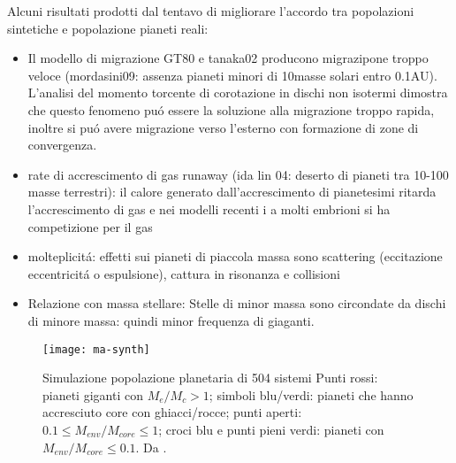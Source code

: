 
\begin{workout}
Alcuni risultati prodotti dal tentavo di migliorare l'accordo tra popolazioni sintetiche  e popolazione pianeti reali:
\begin{itemize}
\item Il modello di migrazione GT80 e tanaka02 producono migrazipone troppo veloce (mordasini09: assenza pianeti minori di 10masse solari entro 0.1AU). L'analisi del momento torcente di corotazione in dischi non isotermi dimostra che questo fenomeno pu\'o essere la soluzione alla migrazione troppo rapida, inoltre si pu\'o avere migrazione verso l'esterno con formazione di zone di convergenza.
\item rate di accrescimento di gas runaway (ida lin 04: deserto di pianeti tra 10-100 masse terrestri): il calore generato dall'accrescimento di pianetesimi ritarda l'accrescimento di gas e nei modelli recenti i a molti embrioni si ha competizione per il gas
\item molteplicit\'a: effetti sui pianeti di piaccola massa sono scattering (eccitazione eccentricit\'a o espulsione), cattura in risonanza e collisioni
\item Relazione con massa stellare: Stelle di minor massa sono circondate da dischi di minore massa: quindi minor frequenza di giaganti.%
\end{itemize}
\end{workout}


\begin{figure}[!ht]
\texttt{[image: ma-synth]}
\caption{Simulazione popolazione planetaria di 504 sistemi Punti rossi: pianeti giganti con $M_e/M_c>1$; simboli blu/verdi: pianeti che hanno accresciuto core con ghiacci/rocce; punti aperti: $0.1\leq M_{env}/M_{core}\leq1$; croci blu e punti pieni verdi: pianeti con $M_{env}/M_{core}\leq0.1$. Da \cite{mordasini2018planetary}.}\label{fig:ma-synth}
\end{figure}


